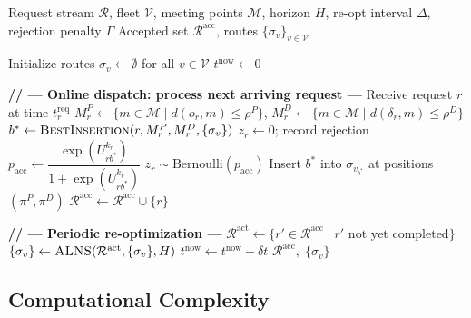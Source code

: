 \begin{algorithm}[h]
\caption{Rolling Horizon ALNS for Bidirectional DARPmp}
\label{alg:rh-alns}
\begin{algorithmic}[1]
\Require Request stream $\mathcal{R}$, fleet $\mathcal{V}$, meeting points $\mathcal{M}$,
         horizon $H$, re-opt interval $\Delta$, rejection penalty $\Gamma$
\Ensure  Accepted set $\mathcal{R}^{\text{acc}}$, routes $\{\sigma_v\}_{v \in \mathcal{V}}$

\State Initialize routes $\sigma_v \leftarrow \emptyset$ for all $v \in \mathcal{V}$
\State $t^{\text{now}} \leftarrow 0$

  \State \textbf{// --- Online dispatch: process next arriving request ---}
  \State Receive request $r$ at time $t_r^{\text{req}}$
  \State $M_r^P \leftarrow \{m \in \mathcal{M} \mid d(o_r, m) \leq \rho^P\}$,
         $M_r^D \leftarrow \{m \in \mathcal{M} \mid d(\delta_r, m) \leq \rho^D\}$
  \State $b^* \leftarrow \textsc{BestInsertion}(r, M_r^P, M_r^D, \{\sigma_v\})$
    \State $z_r \leftarrow 0$; record rejection
  \Else
    \State $p_{\text{acc}} \leftarrow \dfrac{\exp(U_{rb^*}^{k_r})}{1 + \exp(U_{rb^*}^{k_r})}$
    \State $z_r \sim \text{Bernoulli}(p_{\text{acc}})$
      \State Insert $b^*$ into $\sigma_{v_{b^*}}$ at positions $(\pi^P, \pi^D)$
      \State $\mathcal{R}^{\text{acc}} \leftarrow \mathcal{R}^{\text{acc}} \cup \{r\}$
    \EndIf
  \EndIf

  \State \textbf{// --- Periodic re-optimization ---}
    \State $\mathcal{R}^{\text{act}} \leftarrow \{r' \in \mathcal{R}^{\text{acc}} \mid r' \text{ not yet completed}\}$
    \State $\{\sigma_v\} \leftarrow \textsc{ALNS}(\mathcal{R}^{\text{act}}, \{\sigma_v\}, H)$
  \EndIf
  \State $t^{\text{now}} \leftarrow t^{\text{now}} + \delta t$
\EndWhile
\State \Return $\mathcal{R}^{\text{acc}},\; \{\sigma_v\}$
\end{algorithmic}
\end{algorithm}

\subsection{Computational Complexity}\label{subsec:complexity}

